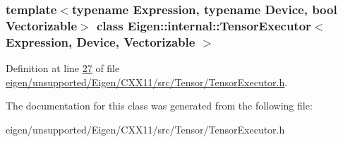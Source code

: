 \subsubsection*{template$<$typename Expression, typename Device, bool Vectorizable$>$\newline
class Eigen\+::internal\+::\+Tensor\+Executor$<$ Expression, Device, Vectorizable $>$}



Definition at line \hyperlink{eigen_2unsupported_2_eigen_2_c_x_x11_2src_2_tensor_2_tensor_executor_8h_source_l00027}{27} of file \hyperlink{eigen_2unsupported_2_eigen_2_c_x_x11_2src_2_tensor_2_tensor_executor_8h_source}{eigen/unsupported/\+Eigen/\+C\+X\+X11/src/\+Tensor/\+Tensor\+Executor.\+h}.



The documentation for this class was generated from the following file\+:\begin{DoxyCompactItemize}
\item 
eigen/unsupported/\+Eigen/\+C\+X\+X11/src/\+Tensor/\+Tensor\+Executor.\+h\end{DoxyCompactItemize}
